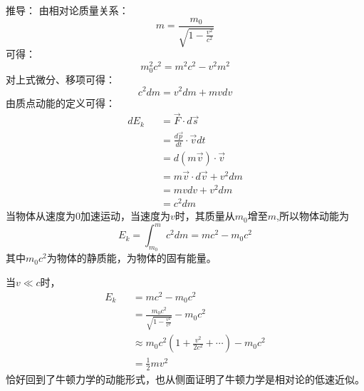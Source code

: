 \documentclass[11pt]{article}
\newcommand{\be}{\begin{equation}}
\newcommand{\ee}{\end{equation}}
\newcommand{\bea}{\setlength\arraycolsep{2pt} \begin{eqnarray}}
\newcommand{\eea}{\end{eqnarray}}
\numberwithin{equation}{section}
\begin{document}
\begin{CJK}{GBK}{song}
推导：
由相对论质量关系：
\be
m=\frac{m_0}{\sqrt{1-\frac{v^2}{c^2}}}
\ee
可得：
\be
m_0^2 c^2=m^2c^2-v^2m^2
\ee
对上式微分、移项可得：
\be
c^2dm=v^2dm+mvdv
\ee
由质点动能的定义可得：
\bea
dE_k&&=\vec{F}\cdot d \vec{s} \\
&&=\frac{d\vec{p}}{dt}\cdot \vec{v} dt\\
&&=d(m \vec{v})\cdot \vec{v} \\
&&=m \vec{v} \cdot d\vec{v}+v^2 dm \\
&&=mvdv+v^2dm\\
&&=c^2dm
\eea
当物体从速度为0加速运动，当速度为$v$时，其质量从$m_0$增至$m$,所以物体动能为
\be
E_k=\int^m_{m_0} c^2 dm=mc^2-m_0c^2
\ee
其中$m_0c^2$为物体的静质能，为物体的固有能量。

当$v\ll c$时，
\bea
E_k&&=mc^2-m_0c^2 \\
&&=\frac{m_0c^2}{\sqrt{1-\frac{v^2}{c^2}}}-m_0c^2 \\
&&\approx m_0c^2(1+\frac{v^2}{2c^2}+ \cdots)-m_0c^2 \\
&&=\frac{1}{2}m v^2
\eea
恰好回到了牛顿力学的动能形式，也从侧面证明了牛顿力学是相对论的低速近似。
\end{CJK}
\end{document}

